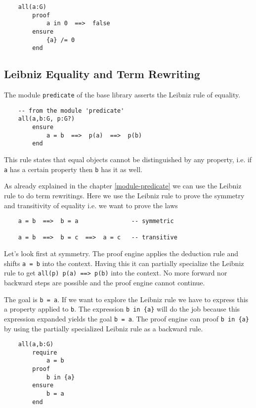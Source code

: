 \begin{lstlisting}
    all(a:G)
        proof
            a in 0  ==>  false
        ensure
            {a} /= 0
        end
\end{lstlisting}



\subsection{Leibniz Equality and Term Rewriting}

The module \lstinline!predicate! of the base library asserts the Leibniz rule
of equality.

\begin{lstlisting}
    -- from the module 'predicate'
    all(a,b:G, p:G?)
        ensure
            a = b  ==>  p(a)  ==>  p(b)
        end
\end{lstlisting}
This rule states that equal objects cannot be distinguished by any property,
i.e. if \lstinline!a! has a certain property then \lstinline!b! has it as
well.

As already explained in the chapter \ref{module-predicate} we can use the
Leibniz rule to do term rewritings. Here we use the Leibniz rule to prove the
symmetry and transitivity of equality i.e. we want to prove the laws
\begin{lstlisting}
    a = b  ==>  b = a               -- symmetric

    a = b  ==>  b = c  ==>  a = c   -- transitive
\end{lstlisting}

Let's look first at symmetry. The proof engine applies the deduction rule and
shifts \lstinline!a = b! into the context. Having this it can partially
specialize the Leibniz rule to get \lstinline!all(p) p(a) ==> p(b)! into the
context. No more forward nor backward steps are possible and the proof engine
cannot continue.

The goal is \lstinline!b = a!. If we want to explore the Leibniz rule we have
to express this a property applied to \lstinline!b!. The expression
\lstinline!b in {a}! will do the job because this expression expanded yields
the goal \lstinline!b = a!. The proof engine can proof \lstinline!b in {a}! by
using the partially specialized Leibniz rule as a backward rule.

\begin{lstlisting}
    all(a,b:G)
        require
            a = b
        proof
            b in {a}
        ensure
            b = a
        end
\end{lstlisting}

